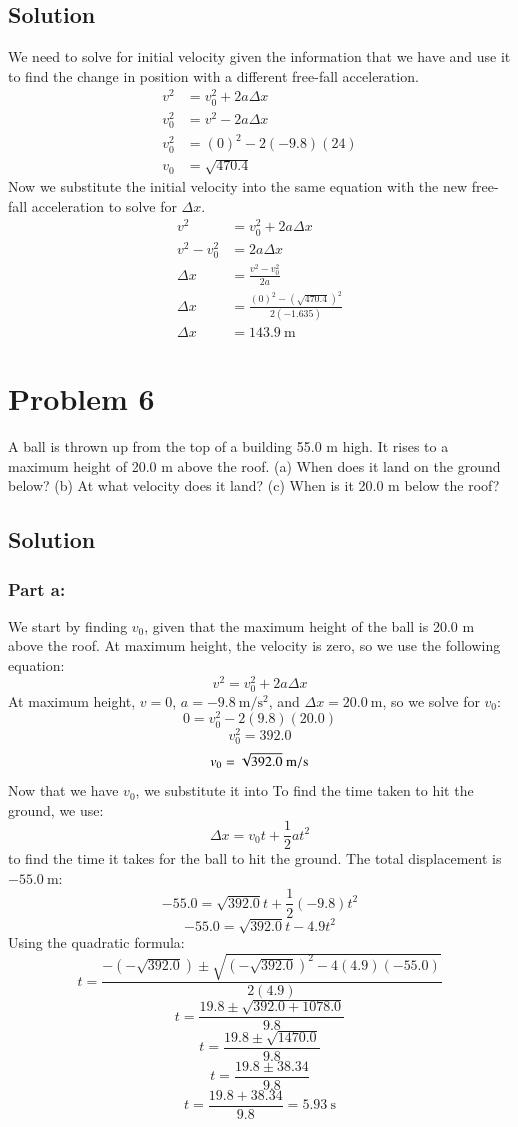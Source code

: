 \documentclass{article}
\begin{document}
\subsection*{Solution}
We need to solve for initial velocity given the information that we have and use it to find the change in position with a different free-fall acceleration.
\begin{align*}
	v^2 &= v_0^2 + 2a \Delta x \\
	v_0^2 & = v^2 - 2a \Delta x \\
	v_0^2 &= (0)^2 -2(-9.8)(24) \\
	v_0 &= \sqrt{470.4}
\end{align*}
Now we substitute the initial velocity into the same equation with the new free-fall acceleration to solve for $\Delta x$.
\begin{align*}
	v^2 &= v_0^2 + 2a \Delta x \\
	v^2 - v_0^2 &= 2a \Delta x \\
	\Delta x &= \frac{v^2 - v_0^2}{2a} \\
	\Delta x &= \frac{(0)^2 - \left( \sqrt{470.4} \right)^2}{2(-1.635)} \\
	\Delta x &= 143.9\ \unit{\meter}
\end{align*}

\section*{Problem 6}
A ball is thrown up from the top of a building 55.0 m high. It rises to a maximum height
of 20.0 m above the roof. (a) When does it land on the ground below? (b) At what velocity
does it land? (c) When is it 20.0 m below the roof?

\subsection*{Solution}
\subsubsection*{Part a:}
We start by finding $v_0$, given that the maximum height of the ball is 20.0 m above the roof. At maximum height, the velocity is zero, so we use the following equation:
\[
	v^2 = v_0^2 + 2a\Delta x
\]
At maximum height, $v = 0$, $a = -9.8\ \unit{\meter\per\second^2}$, and $\Delta x = 20.0\ \unit{\meter}$, so we solve for $v_0$:
\[
	0 = v_0^2 - 2(9.8)(20.0)
\]
\[
	v_0^2 = 392.0
\]
\[
	v_0 = \sqrt{392.0}\ \unit{{\meter\per\second}}
\]
Now that we have $v_0$, we substitute it into
To find the time taken to hit the ground, we use:
\[
	\Delta x = v_0 t + \frac{1}{2} a t^2
\]
to find the time it takes for the ball to hit the ground. The total displacement is $-55.0\ \unit{\meter}$:
\[
	-55.0 = \sqrt{392.0}t + \frac{1}{2}(-9.8)t^2
\]
\[
	-55.0 = \sqrt{392.0}t - 4.9t^2
\]
Using the quadratic formula:
\[
	t = \frac{-(-\sqrt{392.0}) \pm \sqrt{(-\sqrt{392.0})^2 - 4(4.9)(-55.0)}}{2(4.9)}
\]
\[
	t = \frac{19.8 \pm \sqrt{392.0 + 1078.0}}{9.8}
\]
\[
	t = \frac{19.8 \pm \sqrt{1470.0}}{9.8}
\]
\[
	t = \frac{19.8 \pm 38.34}{9.8}
\]
\[
	t = \frac{19.8 + 38.34}{9.8} = 5.93\ \unit{\second}
\]
\end{document}
